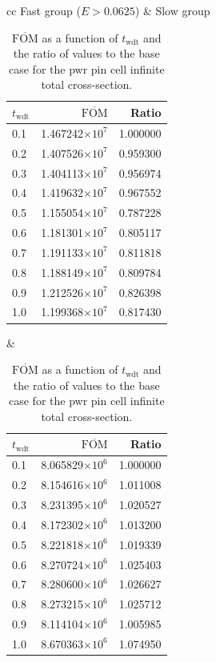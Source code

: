 \begin{table}[hbtp]
  \centering
  \caption[$\overline{\mathrm{FOM}}$ and ratio for
  the \acrshort{pwr} pin cell infinite total cross-section.]{$\overline{\mathrm{FOM}}$ as a function of
    $t_{\mathrm{wdt}}$ and the ratio of values to the base case for
    the \gls{pwr} pin cell infinite total cross-section.}
  \begin{tabular}{cc} Fast group ($E > 0.0625$) & Slow group \\
\begin{tabular}{lrr}
\toprule
$t_{\mathrm{wdt}}$ &                   $\overline{\mathrm{FOM}}$ & Ratio\\
\midrule
 0.1 & 1.467242$\times 10^{7}$ & 1.000000 \\
 0.2 & 1.407526$\times 10^{7}$ & 0.959300 \\
 0.3 & 1.404113$\times 10^{7}$ & 0.956974 \\
 0.4 & 1.419632$\times 10^{7}$ & 0.967552 \\
 0.5 & 1.155054$\times 10^{7}$ & 0.787228 \\
 0.6 & 1.181301$\times 10^{7}$ & 0.805117 \\
 0.7 & 1.191133$\times 10^{7}$ & 0.811818 \\
 0.8 & 1.188149$\times 10^{7}$ & 0.809784 \\
 0.9 & 1.212526$\times 10^{7}$ & 0.826398 \\
 1.0 & 1.199368$\times 10^{7}$ & 0.817430 \\
\bottomrule
\end{tabular} &
\begin{tabular}{lrr}
\toprule
$t_{\mathrm{wdt}}$ &                   $\overline{\mathrm{FOM}}$ &
                                                                   Ratio\\
\midrule
 0.1 & 8.065829$\times 10^{6}$ & 1.000000 \\
 0.2 & 8.154616$\times 10^{6}$ & 1.011008 \\
 0.3 & 8.231395$\times 10^{6}$ & 1.020527 \\
 0.4 & 8.172302$\times 10^{6}$ & 1.013200 \\
 0.5 & 8.221818$\times 10^{6}$ & 1.019339 \\
 0.6 & 8.270724$\times 10^{6}$ & 1.025403 \\
 0.7 & 8.280600$\times 10^{6}$ & 1.026627 \\
 0.8 & 8.273215$\times 10^{6}$ & 1.025712 \\
 0.9 & 8.114104$\times 10^{6}$ & 1.005985 \\
 1.0 & 8.670363$\times 10^{6}$ & 1.074950 \\
\bottomrule
\end{tabular}
  \end{tabular}
  \label{tab:pwr_inf_tot}
\end{table}
